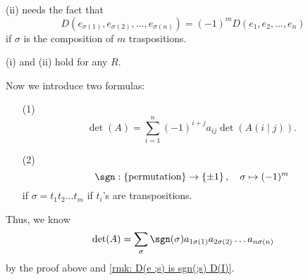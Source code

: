 \begin{remark} \label{rmk: D(e ;s) is sgn(;s) D(I)}
    (ii) needs the fact that 
    \[
        D \left( e_{\sigma (1)}, e_{\sigma (2)}, \dots , e_{\sigma (n)} \right) = (-1)^m D(e_1, e_2, \dots , e_n) 
    \] if \(\sigma \) is the composition of \(m\) traspositions.  
\end{remark}

\begin{remark}
    (i) and (ii) hold for any \(R\). 
\end{remark}

Now we introduce two formulas: 
\begin{itemize}
    \item [(1)] 
    \[
        \det (A) = \sum_{i=1}^n (-1)^{i+j} a_{ij} \det \left( A(i \mid j) \right).  
    \]
    \item [(2)] 
    \[
        \sgn : \left\{ \text{permutation}  \right\} \to \left\{ \pm 1 \right\}, \quad \sigma \mapsto (-1)^m   
    \] if \(\sigma = t_1 t_2 \dots t_m\) if \(t_i\)'s are transpositions.  
\end{itemize}

Thus, we know 
\[
    \det (A) = \sum_{\sigma } \sgn (\sigma ) a_{1 \sigma (1)} a_{2 \sigma (2)} \dots a_{n \sigma (n)} 
\] by the proof above and \autoref{rmk: D(e ;s) is sgn(;s) D(I)}. 
